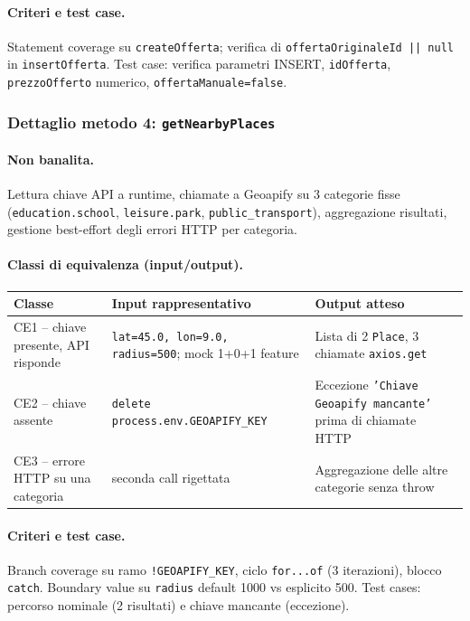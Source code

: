 \documentclass[a4paper,11pt]{article}
\begin{document}
\paragraph{Criteri e test case.}
Statement coverage su \texttt{createOfferta}; verifica di \texttt{offertaOriginaleId || null} in \texttt{insertOfferta}. Test case: verifica parametri INSERT, \texttt{idOfferta}, \texttt{prezzoOfferto} numerico, \texttt{offertaManuale=false}.

\subsubsection{Dettaglio metodo 4: \texttt{getNearbyPlaces}}
\paragraph{Non banalita.}
Lettura chiave API a runtime, chiamate a Geoapify su 3 categorie fisse (\texttt{education.school}, \texttt{leisure.park}, \texttt{public\_transport}), aggregazione risultati, gestione best-effort degli errori HTTP per categoria.

\paragraph{Classi di equivalenza (input/output).}
\begin{table}[H]
\centering
\small
\begin{tabular}{@{}p{}p{}p{}@{}}
\toprule
Classe & Input rappresentativo & Output atteso \\
\midrule
CE1 -- chiave presente, API risponde & \texttt{lat=45.0, lon=9.0, radius=500}; mock 1+0+1 feature & Lista di 2 \texttt{Place}, 3 chiamate \texttt{axios.get} \\
CE2 -- chiave assente & \texttt{delete process.env.GEOAPIFY\_KEY} & Eccezione \texttt{'Chiave Geoapify mancante'} prima di chiamate HTTP \\
CE3 -- errore HTTP su una categoria & seconda call rigettata & Aggregazione delle altre categorie senza throw \\
\bottomrule
\end{tabular}
\end{table}

\paragraph{Criteri e test case.}
Branch coverage su ramo \texttt{!GEOAPIFY\_KEY}, ciclo \texttt{for...of} (3 iterazioni), blocco \texttt{catch}. Boundary value su \texttt{radius} default 1000 vs esplicito 500. Test cases: percorso nominale (2 risultati) e chiave mancante (eccezione).
\end{document}
